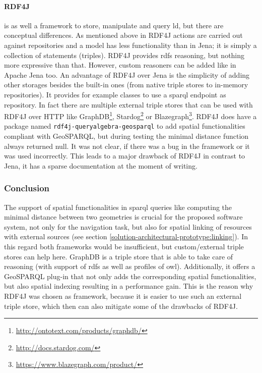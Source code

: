 \documentclass[draft,final]{vutinfth} %
\begin{document}
\paragraph{RDF4J} is as well a framework to store, manipulate and query \gls{ld}, but there are conceptual differences. As mentioned above in RDF4J actions are carried out against repositories and a model has less functionality than in Jena; it is simply a collection of statements (triples). RDF4J provides \gls{rdfs} reasoning, but nothing more expressive than that. However, custom reasoners can be added like in Apache Jena too. An advantage of RDF4J over Jena is the simplicity of adding other storages besides the built-in ones (from native triple stores to in-memory repositories). It provides for example classes to use a \gls{sparql} endpoint as repository. In fact there are multiple external triple stores that can be used with RDF4J over HTTP like GraphDB\footnote{\url{http://ontotext.com/products/graphdb/}}, Stardog\footnote{\url{http://docs.stardog.com/}} or Blazegraph\footnote{\url{https://www.blazegraph.com/product/}}. RDF4J does have a package named \texttt{rdf4j-queryalgebra-geosparql} to add spatial functionalities compliant with GeoSPARQL, but during testing the minimal distance function always returned null. It was not clear, if there was a bug in the framework or it was used incorrectly. This leads to a major drawback of RDF4J in contrast to Jena, it has a sparse documentation at the moment of writing.

\subsubsection{Conclusion}

The support of spatial functionalities in \gls{sparql} queries like computing the minimal distance between two geometries is crucial for the proposed software system, not only for the navigation task, but also for spatial linking of resources with external sources (see section \ref{solution-architectural-prototype:linking}). In this regard both frameworks would be insufficient, but custom/external triple stores can help here. GraphDB is a triple store that is able to take care of reasoning (with support of \gls{rdfs} as well as profiles of \gls{owl}). Additionally, it offers a GeoSPARQL plug-in that not only adds the corresponding spatial functionalities, but also spatial indexing resulting in a performance gain. This is the reason why RDF4J was chosen as framework, because it is easier to use such an external triple store, which then can also mitigate some of the drawbacks of RDF4J.
\end{document}
